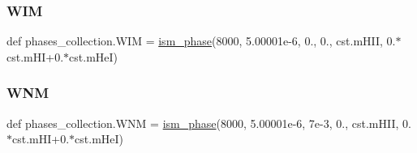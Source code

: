 \mbox{\label{namespacephases__collection_a7a67a11c06d5a83afdb42e75e67ec069}} 
\subsubsection{\texorpdfstring{W\+IM}{WIM}}
{\footnotesize\ttfamily def phases\+\_\+collection.\+W\+IM = \hyperlink{namespacephases__collection_aae55a1d8374bfc3868cd04555c049676}{ism\+\_\+phase}(8000, 5.\+00001e-\/6, 0., 0., cst.\+m\+H\+I\+I, 0.$\ast$cst.\+m\+H\+I+0.$\ast$cst.\+m\+He\+I)}

\mbox{\label{namespacephases__collection_a91f22be2df532cf33b685f7ee6da249d}} 
\subsubsection{\texorpdfstring{W\+NM}{WNM}}
{\footnotesize\ttfamily def phases\+\_\+collection.\+W\+NM = \hyperlink{namespacephases__collection_aae55a1d8374bfc3868cd04555c049676}{ism\+\_\+phase}(8000, 5.\+00001e-\/6, 7e-\/3, 0., cst.\+m\+H\+I\+I, 0.$\ast$cst.\+m\+H\+I+0.$\ast$cst.\+m\+He\+I)}

